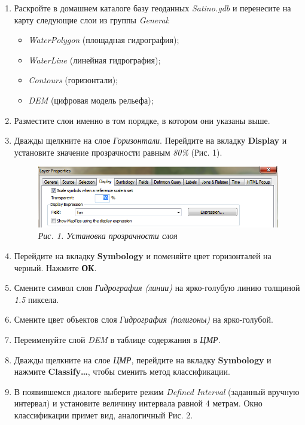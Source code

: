 \documentclass[]{book}
\providecommand{\tightlist}{%
  \setlength{\itemsep}{0pt}\setlength{\parskip}{0pt}}
\theoremstyle{definition}
\theoremstyle{definition}
\theoremstyle{definition}
\theoremstyle{remark}
\begin{document}
\begin{enumerate}
\def\labelenumi{\arabic{enumi}.}
\item
  Раскройте в домашнем каталоге базу геоданных \emph{Satino.gdb} и
  перенесите на карту следующие слои из группы \emph{General}:

  \begin{itemize}
  \tightlist
  \item
    \emph{WaterPolygon} (площадная гидрография);
  \item
    \emph{WaterLine} (линейная гидрография);
  \item
    \emph{Contours} (горизонтали);
  \item
    \emph{DEM} (цифровая модель рельефа);
  \end{itemize}
\item
  Разместите слои именно в том порядке, в котором они указаны выше.
\item
  Дважды щелкните на слое \emph{Горизонтали}. Перейдите на вкладку
  \textbf{Display} и установите значение прозрачности равным \emph{80\%}
  (Рис. 1).

  \begin{figure}
  \centering
  \includegraphics{images/Ex18/image2.png}
  \caption{\emph{Рис. 1. Установка прозрачности слоя}}
  \end{figure}
\item
  Перейдите на вкладку \textbf{Symbology} и поменяйте цвет горизонталей
  на черный. Нажмите \textbf{ОК}.
\item
  Смените символ слоя \emph{Гидрография (линии)} на ярко-голубую линию
  толщиной \emph{1.5} пиксела.
\item
  Смените цвет объектов слоя \emph{Гидрография (полигоны)} на
  ярко-голубой.
\item
  Переименуйте слой \emph{DEM} в таблице содержания в \emph{ЦМР}.
\item
  Дважды щелкните на слое \emph{ЦМР}, перейдите на вкладку
  \textbf{Symbology} и нажмите \textbf{Classify\ldots{}}, чтобы сменить
  метод классификации.
\item
  В появившемся диалоге выберите режим \emph{Defined Interval} (заданный
  вручную интервал) и установите величину интервала равной 4 метрам.
  Окно классификации примет вид, аналогичный Рис. 2.


\end{enumerate}
\end{document}

